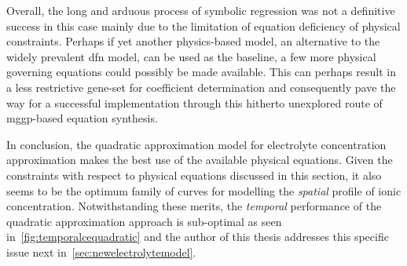 Overall,  the  long  and  arduous  process of  symbolic  regression  was  not  a
definitive  success in  this  case  mainly due  to  the  limitation of  equation
deficiency of physical constraints. Perhaps  if yet another physics-based model,
\ie{} an  alternative to the  widely prevalent \gls{dfn}  model, can be  used as
the  baseline,  a  few  more  physical governing  equations  could  possibly  be
made  available. This  can perhaps  result in  a less  restrictive gene-set  for
coefficient  determination  and  consequently  pave the  way  for  a  successful
implementation  through  this  hitherto  unexplored  route  of  \gls{mggp}-based
equation synthesis.

In conclusion,  the quadratic approximation model  for electrolyte concentration
approximation makes the best use of  the available physical equations. Given the
constraints  with  respect to  physical  equations  discussed in  this  section,
it  also  seems   to  be  the  optimum  family  of   curves  for  modelling  the
\emph{spatial}  profile of  ionic concentration.  Notwithstanding these  merits,
the  \emph{temporal}  performance of  the  quadratic  approximation approach  is
sub-optimal  as seen  in~\cref{fig:temporalcequadratic} and  the author  of this
thesis addresses this specific issue next in~\cref{sec:newelectrolytemodel}.

